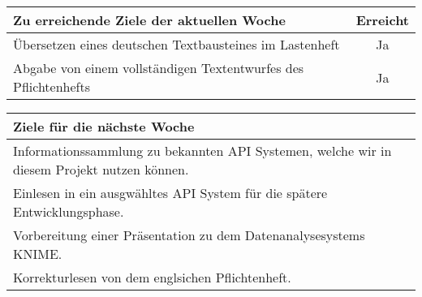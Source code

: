 \begin{tabularx}{\textwidth}{Xc}
    \arrayrulecolor{OliveGreen}
    \toprule
    {\bfseries Zu erreichende Ziele der aktuellen Woche} & {\bfseries Erreicht} \\
    \midrule[2pt]
    Übersetzen eines deutschen Textbausteines im Lastenheft                  &Ja                    \\
    \rowcolor{OliveGreen!15}
    Abgabe von einem vollständigen Textentwurfes des Pflichtenhefts  &Ja                    \\
    \bottomrule[2pt]
\end{tabularx}
%
\vspace{1cm}
%
\begin{tabularx}{\textwidth}{Xc}
    \arrayrulecolor{OliveGreen}
    \toprule
    {\bfseries Ziele für die nächste Woche}              &                      \\
    \midrule[2pt]
    Informationssammlung zu bekannten API Systemen, welche wir in diesem Projekt nutzen können.                               &                      \\
    \rowcolor{OliveGreen!15}
    Einlesen in ein ausgwähltes API System für die spätere Entwicklungsphase.                             &                      \\
    \rowcolor{White}
    Vorbereitung einer Präsentation zu dem Datenanalysesystems KNIME. & \\
    \rowcolor{OliveGreen!15}
    Korrekturlesen von dem englsichen Pflichtenheft. & \\
\end{tabularx}
